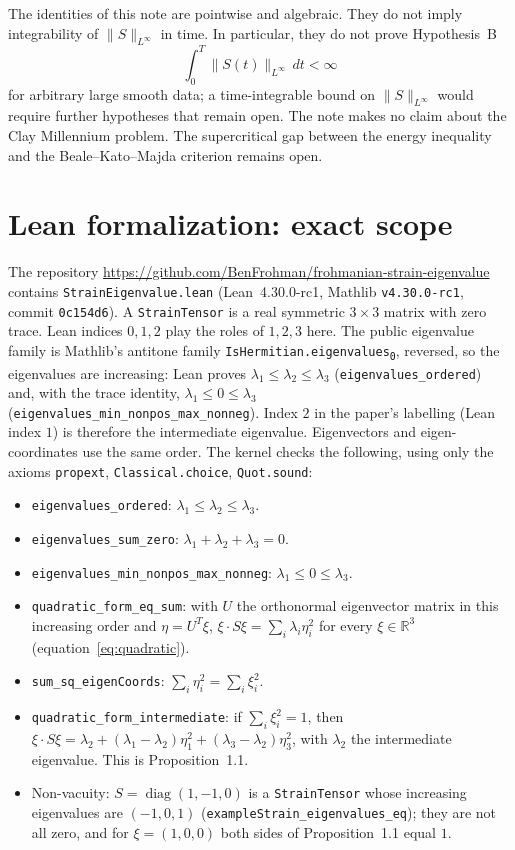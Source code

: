 \documentclass[11pt,a4paper]{article}
\begin{document}
The identities of this note are pointwise and algebraic. They do not imply integrability of \(\|S\|_{L^\infty}\) in time. In particular, they do not prove Hypothesis~B
\[
\int_0^T\|S(t)\|_{L^\infty}\,dt<\infty
\]
for arbitrary large smooth data; a time-integrable bound on \(\|S\|_{L^\infty}\) would require further hypotheses that remain open. The note makes no claim about the Clay Millennium problem. The supercritical gap between the energy inequality and the Beale--Kato--Majda criterion remains open.


\section{Lean formalization: exact scope}\label{sec:lean}

The repository \url{https://github.com/BenFrohman/frohmanian-strain-eigenvalue} contains \texttt{StrainEigenvalue.lean} (Lean~4.30.0-rc1, Mathlib \texttt{v4.30.0-rc1}, commit \texttt{0c154d6}). A \texttt{StrainTensor} is a real symmetric \(3\times3\) matrix with zero trace. Lean indices \(0,1,2\) play the roles of \(1,2,3\) here. The public eigenvalue family is Mathlib's antitone family \texttt{IsHermitian.eigenvalues\textsubscript{0}}, reversed, so the eigenvalues are increasing: Lean proves \(\lambda_1\le\lambda_2\le\lambda_3\) (\texttt{eigenvalues\_ordered}) and, with the trace identity, \(\lambda_1\le0\le\lambda_3\) (\texttt{eigenvalues\_min\_nonpos\_max\_nonneg}). Index \(2\) in the paper's labelling (Lean index \(1\)) is therefore the intermediate eigenvalue. Eigenvectors and eigen-coordinates use the same order. The kernel checks the following, using only the axioms \texttt{propext}, \texttt{Classical.choice}, \texttt{Quot.sound}:
\begin{itemize}
\item \texttt{eigenvalues\_ordered}: \(\lambda_1\le\lambda_2\le\lambda_3\).
\item \texttt{eigenvalues\_sum\_zero}: \(\lambda_1+\lambda_2+\lambda_3=0\).
\item \texttt{eigenvalues\_min\_nonpos\_max\_nonneg}: \(\lambda_1\le0\le\lambda_3\).
\item \texttt{quadratic\_form\_eq\_sum}: with \(U\) the orthonormal eigenvector matrix in this increasing order and \(\eta=U^{T}\xi\), \(\xi\cdot S\xi=\sum_i\lambda_i\eta_i^2\) for every \(\xi\in\mathbb{R}^3\) (equation~\eqref{eq:quadratic}).
\item \texttt{sum\_sq\_eigenCoords}: \(\sum_i\eta_i^2=\sum_i\xi_i^2\).
\item \texttt{quadratic\_form\_intermediate}: if \(\sum_i\xi_i^2=1\), then \(\xi\cdot S\xi=\lambda_2+(\lambda_1-\lambda_2)\eta_1^2+(\lambda_3-\lambda_2)\eta_3^2\), with \(\lambda_2\) the intermediate eigenvalue. This is Proposition~1.1.
\item Non-vacuity: \(S=\operatorname{diag}(1,-1,0)\) is a \texttt{StrainTensor} whose increasing eigenvalues are \((-1,0,1)\) (\texttt{exampleStrain\_eigenvalues\_eq}); they are not all zero, and for \(\xi=(1,0,0)\) both sides of Proposition~1.1 equal \(1\).
\end{itemize}
\end{document}
